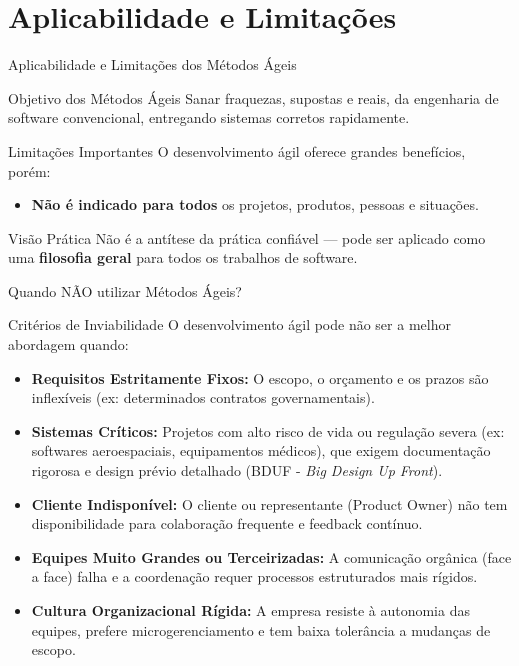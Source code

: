 \documentclass[aspectratio=169, 9pt]{beamer}
\begin{document}
\section{Aplicabilidade e Limitações}

\begin{frame}{Aplicabilidade e Limitações dos Métodos Ágeis}
  \begin{block}{Objetivo dos Métodos Ágeis}
    Sanar fraquezas, supostas e reais, da engenharia de software convencional, entregando sistemas corretos rapidamente.
  \end{block}

  \vspace{0.2cm}
  \begin{alertblock}{Limitações Importantes}
    O desenvolvimento ágil oferece grandes benefícios, porém:
    \begin{itemize}
      \item \textbf{Não é indicado para todos} os projetos, produtos, pessoas e situações.
    \end{itemize}
  \end{alertblock}

  \vspace{0.2cm}
  \begin{block}{Visão Prática}
    Não é a antítese da prática confiável — pode ser aplicado como uma \textbf{filosofia geral} para todos os trabalhos de software.
  \end{block}
\end{frame}
\begin{frame}{Quando NÃO utilizar Métodos Ágeis?}
  \begin{block}{Critérios de Inviabilidade}
    O desenvolvimento ágil pode não ser a melhor abordagem quando:
  \end{block}

  \vspace{0.2cm}
  \begin{itemize}
    \item \textbf{Requisitos Estritamente Fixos:} O escopo, o orçamento e os prazos são inflexíveis (ex: determinados contratos governamentais).
    \item \textbf{Sistemas Críticos:} Projetos com alto risco de vida ou regulação severa (ex: softwares aeroespaciais, equipamentos médicos), que exigem documentação rigorosa e design prévio detalhado (BDUF - \textit{Big Design Up Front}).
    \item \textbf{Cliente Indisponível:} O cliente ou representante (Product Owner) não tem disponibilidade para colaboração frequente e feedback contínuo.
    \item \textbf{Equipes Muito Grandes ou Terceirizadas:} A comunicação orgânica (face a face) falha e a coordenação requer processos estruturados mais rígidos.
    \item \textbf{Cultura Organizacional Rígida:} A empresa resiste à autonomia das equipes, prefere microgerenciamento e tem baixa tolerância a mudanças de escopo.
  \end{itemize}
\end{frame}
\end{document}
